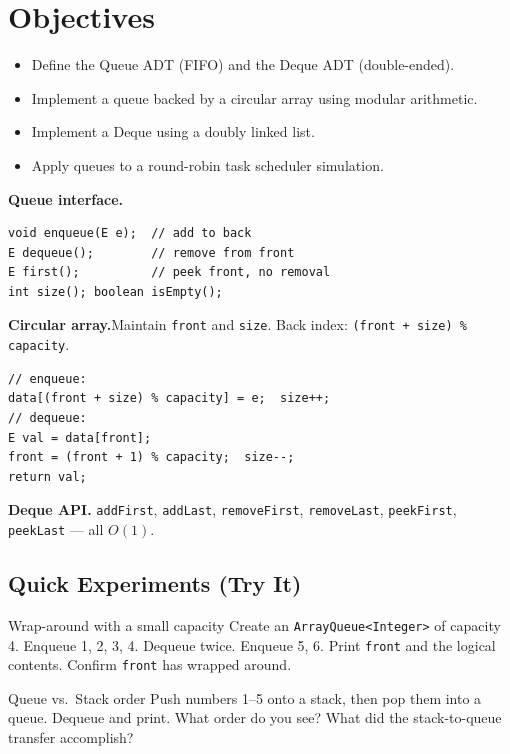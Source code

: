 \documentclass[11pt]{article}
\begin{document}
\labheader

\section*{Objectives}
\begin{itemize}[leftmargin=*,nosep]
  \item Define the Queue ADT (FIFO) and the Deque ADT (double-ended).
  \item Implement a queue backed by a circular array using modular arithmetic.
  \item Implement a Deque using a doubly linked list.
  \item Apply queues to a round-robin task scheduler simulation.
\end{itemize}

\begin{summary}
\textbf{Queue interface.}
\begin{lstlisting}
void enqueue(E e);  // add to back
E dequeue();        // remove from front
E first();          // peek front, no removal
int size(); boolean isEmpty();
\end{lstlisting}

\textbf{Circular array.}\quad Maintain \texttt{front} and \texttt{size}.
Back index: \texttt{(front + size) \% capacity}.
\begin{lstlisting}
// enqueue:
data[(front + size) % capacity] = e;  size++;
// dequeue:
E val = data[front];
front = (front + 1) % capacity;  size--;
return val;
\end{lstlisting}

\textbf{Deque API.}\quad
\texttt{addFirst}, \texttt{addLast}, \texttt{removeFirst}, \texttt{removeLast},
\texttt{peekFirst}, \texttt{peekLast} --- all $O(1)$.
\end{summary}

\subsection*{Quick Experiments (Try It)}

\begin{tryit}{Wrap-around with a small capacity}
Create an \texttt{ArrayQueue<Integer>} of capacity 4.
Enqueue 1, 2, 3, 4. Dequeue twice. Enqueue 5, 6.
Print \texttt{front} and the logical contents.
Confirm \texttt{front} has wrapped around.
\end{tryit}

\begin{tryit}{Queue vs.\ Stack order}
Push numbers 1--5 onto a stack, then pop them into a queue.
Dequeue and print. What order do you see?
What did the stack-to-queue transfer accomplish?
\end{tryit}
\end{document}
